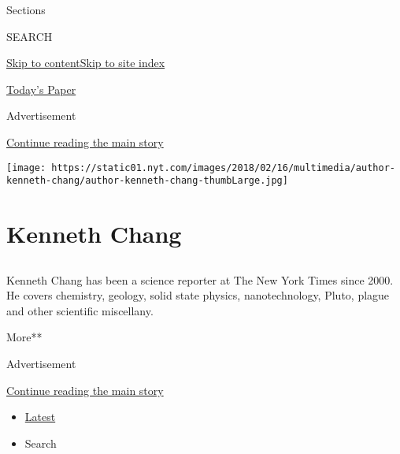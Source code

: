 Sections

SEARCH

\protect\hyperlink{site-content}{Skip to
content}\protect\hyperlink{site-index}{Skip to site index}

\href{https://myaccount.nytimes.com/auth/login?response_type=cookie\&client_id=vi}{}

\href{https://www.nytimes.com/section/todayspaper}{Today's Paper}

Advertisement

\protect\hyperlink{after-top}{Continue reading the main story}

\texttt{[image: https://static01.nyt.com/images/2018/02/16/multimedia/author-kenneth-chang/author-kenneth-chang-thumbLarge.jpg]}

\hypertarget{kenneth-chang}{%
\section{Kenneth Chang}\label{kenneth-chang}}

\subsection{}

Kenneth Chang has been a science reporter at The New York Times since
2000. He covers chemistry, geology, solid state physics, nanotechnology,
Pluto, plague and other scientific miscellany.

More**

Advertisement

\protect\hyperlink{after-mid1}{Continue reading the main story}

\begin{itemize}
\tightlist
\item
  \protect\hyperlink{stream-panel}{Latest}
\item
  Search
\end{itemize}

